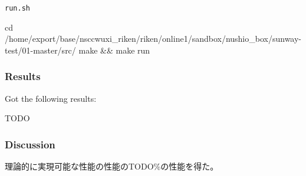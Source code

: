 \verb`run.sh`
\begin{code}

cd /home/export/base/nsccwuxi_riken/riken/online1/sandbox/nushio_box/sunway-test/01-master/src/
make && make run
    
\end{code}

\subsubsection{Results}

Got the following results:

\begin{code}
TODO

\end{code}

\subsubsection{Discussion}


理論的に実現可能な性能の性能のTODO\%の性能を得た。


